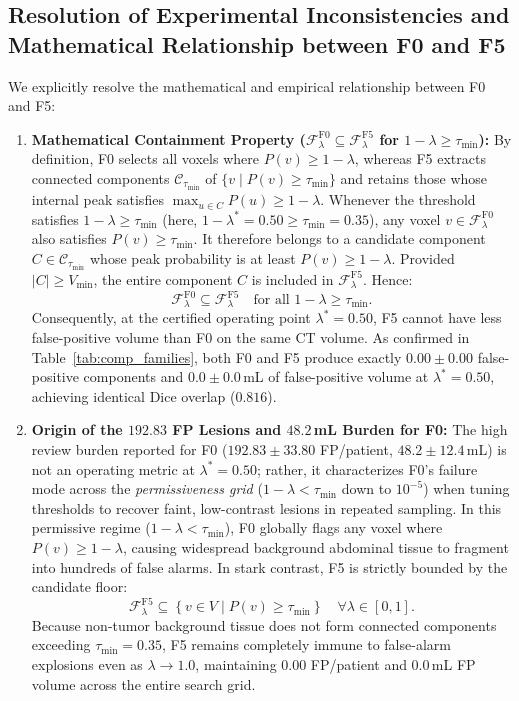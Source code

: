 \documentclass[journal,10pt,twocolumn]{IEEEtran}
\begin{document}
\subsection{Resolution of Experimental Inconsistencies and Mathematical Relationship between F0 and F5}
We explicitly resolve the mathematical and empirical relationship between F0 and F5:
\begin{enumerate}
    \item \textbf{Mathematical Containment Property ($\mathcal{F}_\lambda^{\mathrm{F0}} \subseteq \mathcal{F}_\lambda^{\mathrm{F5}}$ for $1 - \lambda \ge \tau_{\min}$):}
    By definition, F0 selects all voxels where $P(v) \ge 1 - \lambda$, whereas F5 extracts connected components $\mathcal{C}_{\tau_{\min}}$ of $\{v \mid P(v) \ge \tau_{\min}\}$ and retains those whose internal peak satisfies $\max_{u \in C} P(u) \ge 1 - \lambda$. Whenever the threshold satisfies $1 - \lambda \ge \tau_{\min}$ (here, $1 - \lambda^* = 0.50 \ge \tau_{\min} = 0.35$), any voxel $v \in \mathcal{F}_\lambda^{\mathrm{F0}}$ also satisfies $P(v) \ge \tau_{\min}$. It therefore belongs to a candidate component $C \in \mathcal{C}_{\tau_{\min}}$ whose peak probability is at least $P(v) \ge 1 - \lambda$. Provided $|C| \ge V_{\min}$, the entire component $C$ is included in $\mathcal{F}_\lambda^{\mathrm{F5}}$. Hence:
    \begin{equation}
    \mathcal{F}_\lambda^{\mathrm{F0}} \subseteq \mathcal{F}_\lambda^{\mathrm{F5}} \quad \text{for all } 1 - \lambda \ge \tau_{\min}.
    \end{equation}
    Consequently, at the certified operating point $\lambda^* = 0.50$, F5 cannot have less false-positive volume than F0 on the same CT volume. As confirmed in Table~\ref{tab:comp_families}, both F0 and F5 produce exactly $0.00 \pm 0.00$ false-positive components and $0.0 \pm 0.0$\,mL of false-positive volume at $\lambda^* = 0.50$, achieving identical Dice overlap ($0.816$).
    
    \item \textbf{Origin of the $192.83$ FP Lesions and $48.2$\,mL Burden for F0:}
    The high review burden reported for F0 ($192.83 \pm 33.80$ FP/patient, $48.2 \pm 12.4$\,mL) is not an operating metric at $\lambda^* = 0.50$; rather, it characterizes F0's failure mode across the \emph{permissiveness grid} ($1 - \lambda < \tau_{\min}$ down to $10^{-5}$) when tuning thresholds to recover faint, low-contrast lesions in repeated sampling. In this permissive regime ($1 - \lambda < \tau_{\min}$), F0 globally flags any voxel where $P(v) \ge 1 - \lambda$, causing widespread background abdominal tissue to fragment into hundreds of false alarms. In stark contrast, F5 is strictly bounded by the candidate floor:
    \begin{equation}
    \mathcal{F}_\lambda^{\mathrm{F5}} \subseteq \left\{v \in V \mid P(v) \ge \tau_{\min}\right\} \quad \forall \lambda \in [0, 1].
    \end{equation}
    Because non-tumor background tissue does not form connected components exceeding $\tau_{\min} = 0.35$, F5 remains completely immune to false-alarm explosions even as $\lambda \to 1.0$, maintaining $0.00$ FP/patient and $0.0$\,mL FP volume across the entire search grid.


\end{enumerate}
\end{document}

